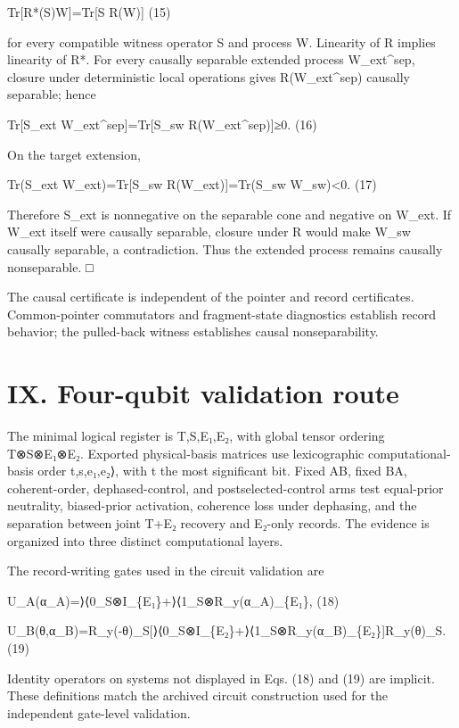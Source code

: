 \documentclass[
]{article}
\begin{document}
Tr{[}R*(S)W{]}=Tr{[}S R(W){]} (15)

for every compatible witness operator S and process W. Linearity of R
implies linearity of R*. For every causally separable extended process
W\_ext\^{}sep, closure under deterministic local operations gives
R(W\_ext\^{}sep) causally separable; hence

Tr{[}S\_ext W\_ext\^{}sep{]}=Tr{[}S\_sw R(W\_ext\^{}sep){]}≥0. (16)

On the target extension,

Tr(S\_ext W\_ext)=Tr{[}S\_sw R(W\_ext){]}=Tr(S\_sw W\_sw)\textless0.
(17)

Therefore S\_ext is nonnegative on the separable cone and negative on
W\_ext. If W\_ext itself were causally separable, closure under R would
make W\_sw causally separable, a contradiction. Thus the extended
process remains causally nonseparable. □

The causal certificate is independent of the pointer and record
certificates. Common-pointer commutators and fragment-state diagnostics
establish record behavior; the pulled-back witness establishes causal
nonseparability.

\section{IX. Four-qubit validation
route}\label{ix.-four-qubit-validation-route}

The minimal logical register is T,S,E₁,E₂, with global tensor ordering
T⊗S⊗E₁⊗E₂. Exported physical-basis matrices use lexicographic
computational-basis order \textbar t,s,e₁,e₂⟩, with t the most
significant bit. Fixed AB, fixed BA, coherent-order, dephased-control,
and postselected-control arms test equal-prior neutrality, biased-prior
activation, coherence loss under dephasing, and the separation between
joint T+E₂ recovery and E₂-only records. The evidence is organized into
three distinct computational layers.

The record-writing gates used in the circuit validation are

U\_A(α\_A)=⟩⟨0\textbar\_S⊗I\_\{E₁\}+⟩⟨1\textbar\_S⊗R\_y(α\_A)\_\{E₁\},
(18)

U\_B(θ,α\_B)=R\_y(-θ)\_S{[}⟩⟨0\textbar\_S⊗I\_\{E₂\}+⟩⟨1\textbar\_S⊗R\_y(α\_B)\_\{E₂\}{]}R\_y(θ)\_S.
(19)

Identity operators on systems not displayed in Eqs. (18) and (19) are
implicit. These definitions match the archived circuit construction used
for the independent gate-level validation.
\end{document}
